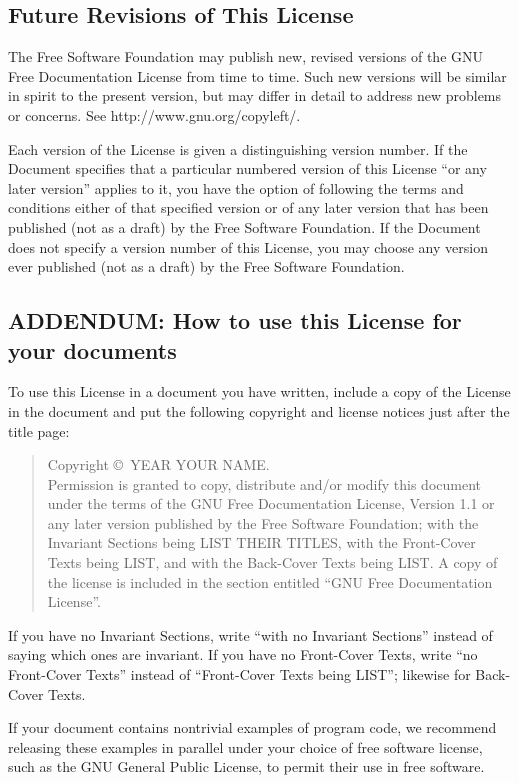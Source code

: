 \documentclass[11pt,a4paper,oneside]{article}
\begin{document}
\subsection{Future Revisions of This License}
\label{sec:gnu-free-doc-license:future-revis-this-license}

The Free Software Foundation may publish new, revised versions of the
GNU Free Documentation License from time to time.  Such new versions
will be similar in spirit to the present version, but may differ in
detail to address new problems or concerns. See
http://www.gnu.org/copyleft/.

Each version of the License is given a distinguishing version number.
If the Document specifies that a particular numbered version of this
License ``or any later version'' applies to it, you have the option of
following the terms and conditions either of that specified version or
of any later version that has been published (not as a draft) by the
Free Software Foundation.  If the Document does not specify a version
number of this License, you may choose any version ever published (not
as a draft) by the Free Software Foundation.


\subsection*{ADDENDUM: How to use this License for your documents}

To use this License in a document you have written, include a copy of
the License in the document and put the following copyright and license
notices just after the title page:

\begin{quote}
  Copyright \copyright\ YEAR YOUR NAME.\\
  Permission is granted to copy, distribute and/or modify this document
  under the terms of the GNU Free Documentation License, Version 1.1 or
  any later version published by the Free Software Foundation; with the
  Invariant Sections being LIST THEIR TITLES, with the Front-Cover Texts
  being LIST, and with the Back-Cover Texts being LIST.  A copy of the
  license is included in the section entitled ``GNU Free Documentation
  License''.
\end{quote}

If you have no Invariant Sections, write ``with no Invariant Sections''
instead of saying which ones are invariant.  If you have no Front-Cover
Texts, write ``no Front-Cover Texts'' instead of ``Front-Cover Texts
being LIST''; likewise for Back-Cover Texts.

If your document contains nontrivial examples of program code, we
recommend releasing these examples in parallel under your choice of free
software license, such as the GNU General Public License, to permit
their use in free software.
\end{document}
